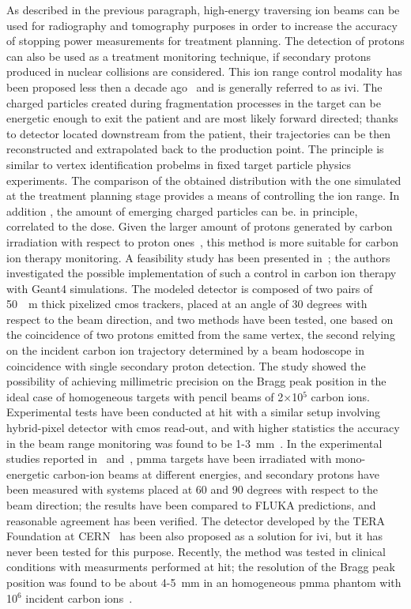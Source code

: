 As described in the previous paragraph, high-energy traversing ion beams can be used for radiography and tomography purposes in order to increase the accuracy of stopping power measurements for treatment planning. The detection of protons can also be used as a treatment monitoring technique, if secondary protons produced in nuclear collisions are considered. This ion range control modality has been proposed less then a decade ago~\parencite{Dauvergne2009, Amaldi2010b} and is generally referred to as \gls{ivi}. The charged particles created during fragmentation processes in the target can be energetic enough to exit the patient and are most likely forward directed; thanks to detector located downstream from the patient, their trajectories can be then reconstructed and extrapolated back to the production point. The principle is similar to vertex identification probelms in fixed target particle physics experiments. The comparison of the obtained distribution with the one simulated at the treatment planning stage provides a means of controlling the ion range. In addition , the amount of emerging charged particles can be. in principle, correlated to the dose. Given the larger amount of protons generated by carbon irradiation with respect to proton ones~\parencite{Gunzert-Marx2008}, this method is more suitable for carbon ion therapy monitoring.  
A feasibility study has been presented in~\cite{Henriquet2012}; the authors investigated the possible implementation of such a control in carbon ion therapy with Geant4 simulations. The modeled detector is composed of two pairs of 50~\charmu ~m thick pixelized \gls{cmos} trackers, placed at an angle of 30 degrees with respect to the beam direction, and two methods have been tested, one based on the coincidence of two protons emitted from the same vertex, the second relying on the incident carbon ion trajectory determined by a beam hodoscope in coincidence with single secondary proton detection. The study showed the possibility of achieving millimetric precision on the Bragg peak position in the ideal case of homogeneous targets with pencil beams of 2$\times$10$^5$ carbon ions. Experimental tests have been conducted at \gls{hit} with a similar setup involving hybrid-pixel detector with \gls{cmos} read-out, and with higher statistics the accuracy in the beam range monitoring was found to be 1-3~mm~\parencite{Gwosch2013}. In the experimental studies reported in~\cite{Agodi2012} and~\cite{Piersanti2014}, \gls{pmma} targets have been irradiated with mono-energetic carbon-ion beams at different energies, and secondary protons have been measured with systems placed at 60 and 90 degrees with respect to the beam direction; the results have been compared to FLUKA predictions, and reasonable agreement has been verified. The detector developed by the TERA Foundation at CERN~\parencite{BucciantonioPhD2015} has been also proposed as a solution for \gls{ivi}, but it has never been tested for this purpose. Recently, the method was tested in clinical conditions with measurments performed at \gls{hit}; the resolution of the Bragg peak position was found to be about 4-5~mm in an homogeneous \gls{pmma} phantom with 10$^6$ incident carbon ions~\parencite{Finck2017}.
